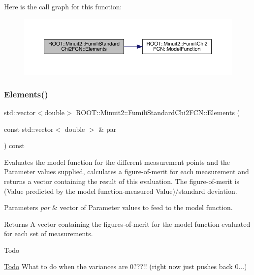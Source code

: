 Here is the call graph for this function\+:\nopagebreak
\begin{figure}[H]
\begin{center}
\leavevmode
\includegraphics[width=350pt]{d8/db2/classROOT_1_1Minuit2_1_1FumiliStandardChi2FCN_ae7683cdbfa4160902add963d2132ab76_cgraph}
\end{center}
\end{figure}
\mbox{\label{classROOT_1_1Minuit2_1_1FumiliStandardChi2FCN_ab05d3fe2dcb9b1c56b6753debe5e0064}} 
\subsubsection{\texorpdfstring{Elements()}{Elements()}\hspace{0.1cm}{\footnotesize\ttfamily [2/2]}}
{\footnotesize\ttfamily std\+::vector$<$double$>$ R\+O\+O\+T\+::\+Minuit2\+::\+Fumili\+Standard\+Chi2\+F\+C\+N\+::\+Elements (\begin{DoxyParamCaption}\item[{const std\+::vector$<$ double $>$ \&}]{par }\end{DoxyParamCaption}) const\hspace{0.3cm}{\ttfamily [virtual]}}

Evaluates the model function for the different measurement points and the Parameter values supplied, calculates a figure-\/of-\/merit for each measurement and returns a vector containing the result of this evaluation. The figure-\/of-\/merit is (Value predicted by the model function-\/measured Value)/standard deviation.


\begin{DoxyParams}{Parameters}
{\em par} & vector of Parameter values to feed to the model function.\\
\hline
\end{DoxyParams}
\begin{DoxyReturn}{Returns}
A vector containing the figures-\/of-\/merit for the model function evaluated for each set of measurements.
\end{DoxyReturn}
\begin{DoxyRefDesc}{Todo}
\item[\mbox{\hyperlink{todo__todo000022}{Todo}}]What to do when the variances are 0???!! (right now just pushes back 0...)\end{DoxyRefDesc}



